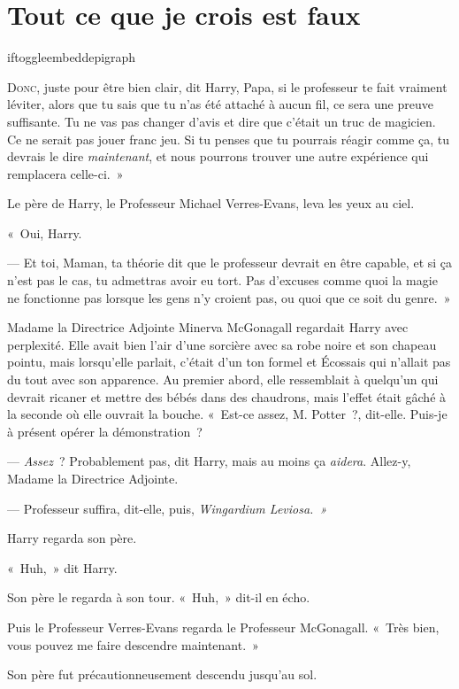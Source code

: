 \chapter{Tout ce que je crois est faux}

iftoggle{embeddepigraph}{}{}

\lettrine[ante=«~]{D}{onc}, juste pour être bien clair, dit Harry, Papa, si le professeur te fait vraiment léviter, alors que tu sais que tu n'as été attaché à aucun fil, ce sera une preuve suffisante. Tu ne vas pas changer d'avis et dire que c'était un truc de magicien. Ce ne serait pas jouer franc jeu. Si tu penses que tu pourrais réagir comme ça, tu devrais le dire \emph{maintenant}, et nous pourrons trouver une autre expérience qui remplacera celle-ci.~»

Le père de Harry, le Professeur Michael Verres-Evans, leva les yeux au ciel.

«~Oui, Harry.

--- Et toi, Maman, ta théorie dit que le professeur devrait en être capable, et si ça n'est pas le cas, tu admettras avoir eu tort. Pas d'excuses comme quoi la magie ne fonctionne pas lorsque les gens n'y croient pas, ou quoi que ce soit du genre.~»

Madame la Directrice Adjointe Minerva McGonagall regardait Harry avec perplexité. Elle avait bien l'air d'une sorcière avec sa robe noire et son chapeau pointu, mais lorsqu'elle parlait, c'était d'un ton formel et Écossais qui n'allait pas du tout avec son apparence. Au premier abord, elle ressemblait à quelqu'un qui devrait ricaner et mettre des bébés dans des chaudrons, mais l'effet était gâché à la seconde où elle ouvrait la bouche. «~Est-ce assez, M. Potter~?, dit-elle. Puis-je à présent opérer la démonstration~?

--- \emph{Assez}~? Probablement pas, dit Harry, mais au moins ça \emph{aidera}. Allez-y, Madame la Directrice Adjointe.

--- Professeur suffira, dit-elle, puis, \emph{Wingardium Leviosa.~»}

Harry regarda son père.

«~Huh,~» dit Harry.

Son père le regarda à son tour. «~Huh,~» dit-il en écho.

Puis le Professeur Verres-Evans regarda le Professeur McGonagall. «~Très bien, vous pouvez me faire descendre maintenant.~»

Son père fut précautionneusement descendu jusqu'au sol.

